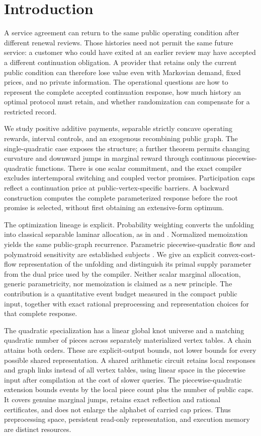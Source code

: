 \section{Introduction}\label{sec:introduction}
A service agreement can return to the same public operating condition after different renewal reviews. Those histories need not permit the same future service: a customer who could have exited at an earlier review may have accepted a different continuation obligation. A provider that retains only the current public condition can therefore lose value even with Markovian demand, fixed prices, and no private information. The operational questions are how to represent the complete accepted continuation response, how much history an optimal protocol must retain, and whether randomization can compensate for a restricted record.

We study positive additive payments, separable strictly concave operating rewards, interval controls, and an exogenous recombining public graph. The single-quadratic case exposes the structure; a further theorem permits changing curvature and downward jumps in marginal reward through continuous piecewise-quadratic functions. There is one scalar commitment, and the exact compiler excludes intertemporal switching and coupled vector promises. Participation caps reflect a continuation price at public-vertex-specific barriers. A backward construction computes the complete parameterized response before the root promise is selected, without first obtaining an extensive-form optimum.

The optimization lineage is explicit. Probability weighting converts the unfolding into classical separable laminar allocation, as in \citet{Mjelde1983} and \citet{Tang1990}. Normalized memoization yields the same public-graph recurrence. Parametric piecewise-quadratic flow and polymatroid sensitivity are established subjects \citep{KlimmWarode2021,HarksKlimmPeis2018}. We give an explicit convex-cost-flow representation of the unfolding and distinguish its primal supply parameter from the dual price used by the compiler. Neither scalar marginal allocation, generic parametricity, nor memoization is claimed as a new principle. The contribution is a quantitative event budget measured in the compact public input, together with exact rational preprocessing and representation choices for that complete response.

The quadratic specialization has a linear global knot universe and a matching quadratic number of pieces across separately materialized vertex tables. A chain attains both orders. These are explicit-output bounds, not lower bounds for every possible shared representation. A shared arithmetic circuit retains local responses and graph links instead of all vertex tables, using linear space in the piecewise input after compilation at the cost of slower queries. The piecewise-quadratic extension bounds events by the local piece count plus the number of public caps. It covers genuine marginal jumps, retains exact reflection and rational certificates, and does not enlarge the alphabet of carried cap prices. Thus preprocessing space, persistent read-only representation, and execution memory are distinct resources.

